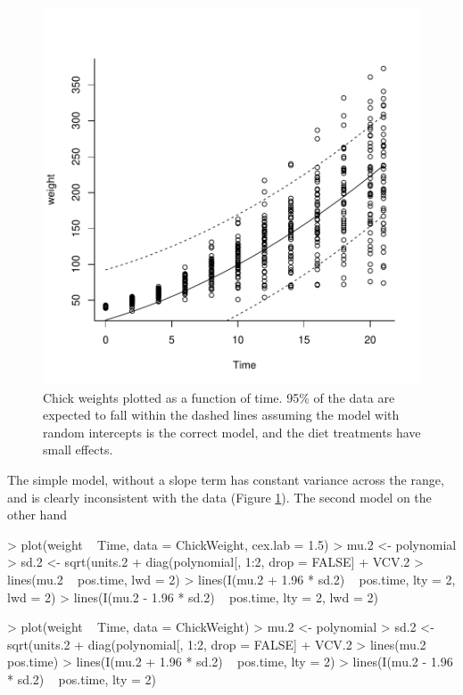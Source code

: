 \documentclass{article}
\begin{document}
\begin{figure}[!h]
\begin{center}
\includegraphics{Lecture4-034}
\end{center}
\caption{Chick weights plotted as a function of time. 95\% of the data are expected to fall within the dashed lines assuming the model with random intercepts is the correct model, and the diet treatments have small effects.}
\label{VCVpred.1-fig}
\end{figure}

The simple model, without a slope term has constant variance across the range, and is clearly inconsistent with the data (Figure \ref{VCVpred.1-fig}). The second model on the other hand

\iftalk
\begin{Schunk}
\begin{Sinput}
> plot(weight ~ Time, data = ChickWeight, cex.lab = 1.5)
> mu.2 <- polynomial %
> sd.2 <- sqrt(units.2 + diag(polynomial[, 1:2, drop = FALSE] %
+     VCV.2 %
> lines(mu.2 ~ pos.time, lwd = 2)
> lines(I(mu.2 + 1.96 * sd.2) ~ pos.time, lty = 2, lwd = 2)
> lines(I(mu.2 - 1.96 * sd.2) ~ pos.time, lty = 2, lwd = 2)
\end{Sinput}
\end{Schunk}
\else
\begin{Schunk}
\begin{Sinput}
> plot(weight ~ Time, data = ChickWeight)
> mu.2 <- polynomial %
> sd.2 <- sqrt(units.2 + diag(polynomial[, 1:2, drop = FALSE] %
+     VCV.2 %
> lines(mu.2 ~ pos.time)
> lines(I(mu.2 + 1.96 * sd.2) ~ pos.time, lty = 2)
> lines(I(mu.2 - 1.96 * sd.2) ~ pos.time, lty = 2)
\end{Sinput}
\end{Schunk}
\fi
\end{document}
